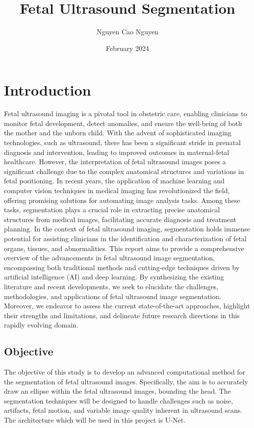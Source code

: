 \documentclass[twocolumn]{report}
\title{Fetal Ultrasound Segmentation}
\author{Nguyen Cao Nguyen}
\date{February 2024}
\begin{document}
\maketitle

\chapter{Introduction}
Fetal ultrasound imaging is a pivotal tool in obstetric care, enabling clinicians to monitor fetal development, detect anomalies, and ensure the well-being of both the mother and the unborn child. With the advent of sophisticated imaging technologies, such as ultrasound, there has been a significant stride in prenatal diagnosis and intervention, leading to improved outcomes in maternal-fetal healthcare. However, the interpretation of fetal ultrasound images poses a significant challenge due to the complex anatomical structures and variations in fetal positioning.
In recent years, the application of machine learning and computer vision techniques in medical imaging has revolutionized the field, offering promising solutions for automating image analysis tasks. Among these tasks, segmentation plays a crucial role in extracting precise anatomical structures from medical images, facilitating accurate diagnosis and treatment planning. In the context of fetal ultrasound imaging, segmentation holds immense potential for assisting clinicians in the identification and characterization of fetal organs, tissues, and abnormalities.
This report aims to provide a comprehensive overview of the advancements in fetal ultrasound image segmentation, encompassing both traditional methods and cutting-edge techniques driven by artificial intelligence (AI) and deep learning. By synthesizing the existing literature and recent developments, we seek to elucidate the challenges, methodologies, and applications of fetal ultrasound image segmentation. Moreover, we endeavor to assess the current state-of-the-art approaches, highlight their strengths and limitations, and delineate future research directions in this rapidly evolving domain.
\section{Objective}
The objective of this study is to develop an advanced computational method for the segmentation of fetal ultrasound images. Specifically, the aim is to accurately draw an ellipse within the fetal ultrasound images, bounding the head. The segmentation techniques will be designed to handle challenges such as noise, artifacts, fetal motion, and variable image quality inherent in ultrasound scans. The architecture which will be used in this project is U-Net.
\end{document}
